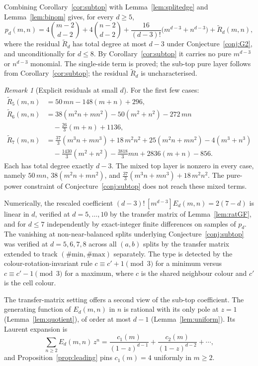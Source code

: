 \documentclass[11pt]{article}
\theoremstyle{definition}
\theoremstyle{remark}
\newtheorem{remark}[theorem]{Remark}
\begin{document}
Combining Corollary~\ref{cor:subtop} with Lemma~\ref{lem:splitedge} and
Lemma~\ref{lem:binom} gives, for every $d\ge5$,
\[
  p_d(m,n) = 4\binom{m-2}{d-2} + 4\binom{n-2}{d-2}
           + \frac{16}{(d-3)!}\bigl(m^{d-3}+n^{d-3}\bigr)
           + \tilde R_d(m,n),
\]
where the residual $\tilde R_d$ has total degree at most $d-3$ under
Conjecture~\ref{conj:G2}, and unconditionally for $d\le8$. By
Corollary~\ref{cor:subtop} it carries no pure $m^{d-3}$ or $n^{d-3}$ monomial. The
single-side term is proved; the sub-top pure layer follows from
Corollary~\ref{cor:subtop}; the residual $\tilde R_d$ is uncharacterised.

\begin{remark}[Explicit residuals at small $d$]
For the first few cases:
{\allowdisplaybreaks
\begin{align*}
  \tilde R_5(m,n) &= 50\,mn - 148(m+n) + 296,\\
  \tilde R_6(m,n) &= 38(m^2n+mn^2) - 50(m^2+n^2) - 272\,mn\\
                   &\quad{} - \tfrac{26}{3}(m+n) + 1136,\\
  \tilde R_7(m,n) &= \tfrac{37}{3}(m^3n+mn^3) + 18\,m^2n^2
                      + 25(m^2n+mn^2) - 4(m^3+n^3)\\
                   &\quad{} - \tfrac{1430}{3}(m^2+n^2) - \tfrac{3818}{3}mn
                      + 2836(m+n) - 856.
\end{align*}}%
Each has total degree exactly $d-3$. The mixed top layer is nonzero in every
case, namely $50\,mn$, $38(m^2n+mn^2)$, and $\tfrac{37}{3}(m^3n+mn^3) + 18\,m^2n^2$. The
pure-power constraint of Conjecture~\ref{conj:subtop} does not reach these mixed terms.
\end{remark}

Numerically, the rescaled coefficient $(d-3)!\,[m^{d-3}]E_d(m,n) = 2(7-d)$ is
linear in $d$, verified at $d=5,\dots,10$ by the transfer matrix of
Lemma~\ref{lem:ratGF}, and for $d\le7$ independently by exact-integer finite
differences on samples of $p_d$. The vanishing at non-near-balanced splits underlying
Conjecture~\ref{conj:subtop} was verified at $d=5,6,7,8$ across all $(a,b)$
splits by the transfer matrix extended to track $(\#\mathrm{min},
\#\mathrm{max})$ separately. The type is detected by the colour-rotation-invariant
rule $c\equiv c'+1\pmod3$ for a minimum versus $c\equiv c'-1\pmod3$ for a maximum, where $c$ is
the shared neighbour colour and $c'$ is the cell colour.

The transfer-matrix setting offers a second view of the sub-top coefficient. The generating
function of $E_d(m,n)$ in $n$ is rational with its only pole at $z=1$
(Lemma~\ref{lem:quotient}), of order at most $d-1$ (Lemma~\ref{lem:uniform}). Its Laurent expansion is
\[
  \sum_{n\ge2}E_d(m,n)\,z^n
   = \frac{c_1(m)}{(1-z)^{d-1}} + \frac{c_2(m)}{(1-z)^{d-2}} + \cdots,
\]
and Proposition~\ref{prop:leading} pins $c_1(m)=4$ uniformly in $m\ge2$.
\end{document}
